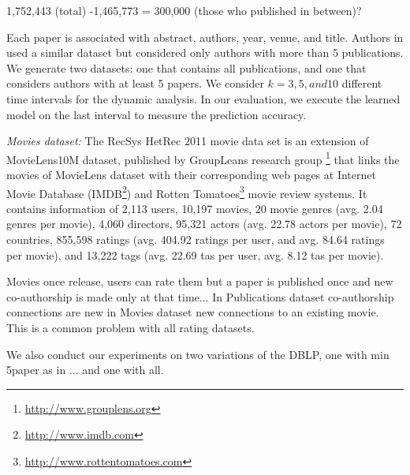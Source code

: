     1,752,443 (total) -1,465,773 = 300,000 (those who published in between)?
    
    
    Each paper is associated with abstract, authors, year, venue, and title.  Authors in \cite{sun2011ASONAM} used a similar dataset but considered only authors with more than 5 publications. We generate two datasets: one that contains all publications, and one that considers authors with at least 5 papers. We consider $k=3, 5, and 10$ different time intervals for the dynamic analysis. In our evaluation, we execute the learned model on the last interval to measure the prediction accuracy.
    
\textit{Movies dataset:} The RecSys HetRec 2011 movie data set \cite{Cantador:RecSys2011} is an extension of MovieLens10M dataset, published by GroupLeans research group \footnote{\url{http://www.grouplens.org}} that links the movies of MovieLens dataset with their corresponding web pages at Internet Movie Database (IMDB\footnote{\url{http://www.imdb.com}}) and Rotten Tomatoes\footnote{\url{http://www.rottentomatoes.com}} movie review systems. It contains information of 2,113 users, 10,197 movies, 20 movie genres (avg. 2.04 genres per movie), 4,060 directors, 95,321 actors (avg. 22.78 actors per movie), 72 countries, 855,598 ratings (avg. 404.92 ratings per user, and avg. 84.64 ratings per movie), and 13,222 tags (avg. 22.69 tas per user, avg. 8.12 tas per movie).


Movies once release, users can rate them but a paper is published once and new co-authorship is made only at that time... In Publications dataset co-authorship connections are new in Movies dataset new connections to an existing movie. This is a common problem with all rating datasets.

We also conduct our experiments on two variations of the DBLP, one with min 5paper as in ... and one with all.



